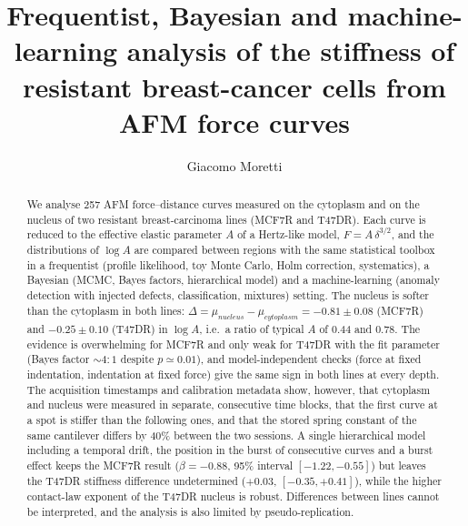 \documentclass[reprint,nofootinbib,amsmath,amssymb,aps,floatfix]{revtex4-2}
\begin{document}
\title{Frequentist, Bayesian and machine-learning analysis of the stiffness of resistant breast-cancer cells from AFM force curves}

\author{Giacomo Moretti}

\begin{abstract}
We analyse 257 AFM force--distance curves measured on the cytoplasm and on the nucleus of two resistant breast-carcinoma
lines (MCF7R and T47DR). Each curve is reduced to the effective elastic parameter $A$ of a Hertz-like model,
$F=A\,\delta^{3/2}$, and the distributions of $\log A$ are compared between regions with the same statistical
toolbox in a frequentist (profile likelihood, toy Monte Carlo, Holm correction, systematics), a Bayesian (MCMC, Bayes
factors, hierarchical model) and a machine-learning (anomaly detection with injected defects, classification,
mixtures) setting. The nucleus is softer than the cytoplasm in both lines: $\Delta=\mu_{nucleus}-\mu_{cytoplasm}=-0.81\pm0.08$
(MCF7R) and $-0.25\pm0.10$ (T47DR) in $\log A$, i.e.\ a ratio of typical $A$ of 0.44 and 0.78. The evidence is overwhelming for MCF7R and
only weak for T47DR with the fit parameter (Bayes factor $\sim4{:}1$ despite $p\simeq0.01$), and model-independent checks (force at fixed indentation, indentation at fixed force) give the same sign in both lines at every depth. The acquisition timestamps and calibration metadata show, however, that cytoplasm and nucleus were measured in separate, consecutive time blocks, that the first curve at a spot is stiffer than the following ones, and that the stored spring constant of the same cantilever differs by 40\% between the two sessions. A single hierarchical model including a temporal drift, the position in the burst of consecutive curves and a burst effect keeps the MCF7R result ($\beta=-0.88$, 95\% interval $[-1.22,-0.55]$) but leaves the T47DR stiffness difference undetermined ($+0.03$, $[-0.35,+0.41]$), while the higher contact-law exponent of the T47DR nucleus is robust. Differences between lines cannot be interpreted, and the analysis is also limited by pseudo-replication.
\end{abstract}

\maketitle
\end{document}
